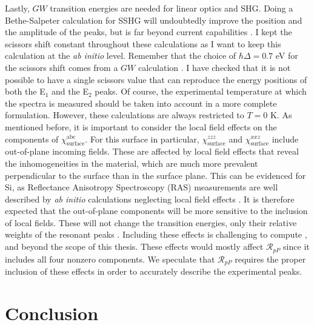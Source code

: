 Lastly, $GW$ transition energies are needed for linear optics and SHG. Doing a
Bethe-Salpeter calculation for SSHG will undoubtedly improve the position and
the amplitude of the peaks, but is far beyond current capabilities \cite{puff}.
I kept the scissors shift constant throughout these calculations as I want to
keep this calculation at the {\em ab initio} level. Remember that the choice of
$\hbar\Delta=0.7$ eV for the scissors shift comes from a $GW$ calculation
\cite{liPRB10}. I have checked that it is not possible to have a single scissors
value that can reproduce the energy positions of both the E$_{1}$ and the
E$_{2}$ peaks. Of course, the experimental temperature at which the spectra is
measured should be taken into account in a more complete formulation. However,
these calculations are always restricted to $T=0$ K. As mentioned before, it is
important to consider the local field effects on the components of
$\chi^{\mathrm{abc}}_{\mathrm{surface}}$. For this surface in particular,
$\chi^{zzz}_{\mathrm{surface}}$ and $\chi^{xxz}_{\mathrm{surface}}$ include
out-of-plane incoming fields. These are affected by local field effects
\cite{tancognedejean:tel-01235611} that reveal the inhomogeneities in the
material, which are much more prevalent perpendicular to the surface than in the
surface plane. This can be evidenced for Si, as Reflectance Anisotropy
Spectroscopy (RAS) measurements are well described by \emph{ab initio}
calculations neglecting local field effects \cite{palummoPRB99, gaalPRB09}. It
is therefore expected that the out-of-plane components will be more sensitive to
the inclusion of local fields. These will not change the transition energies,
only their relative weights of the resonant peaks
\cite{tancognedejean:tel-01235611}. Including these effects is challenging to
compute \cite{nicolasPRB15}, and beyond the scope of this thesis. These effects
would mostly affect $\mathcal{R}_{pP}$ since it includes all four nonzero
components. We speculate that $\mathcal{R}_{pP}$ requires the proper inclusion
of these effects in order to accurately describe the experimental peaks.



\section{Conclusion}

